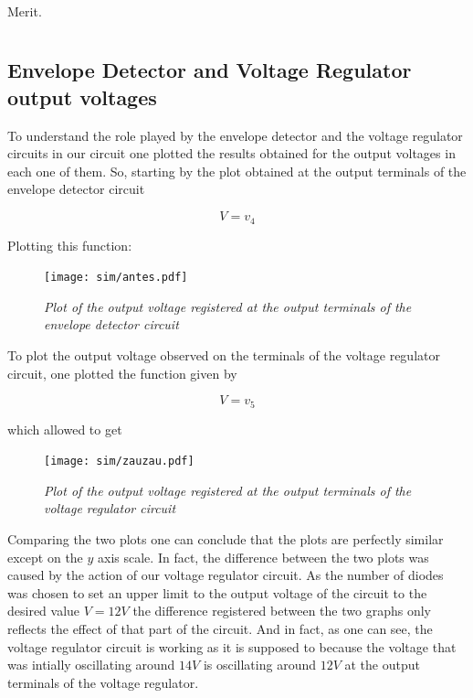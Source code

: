 \begin{table}[H]
    \centering
    \begin{tabular}{|c|c|}
          \hline
          
          \hline
    \end{tabular}
    \caption{Merit.}
    \label{tab:fresnel}
\end{table}

\subsection{Envelope Detector and Voltage Regulator output voltages}
To understand the role played by the envelope detector and the voltage regulator circuits in our circuit one plotted the results obtained for the output voltages in each one of them. So, starting by the plot obtained at the output terminals of the envelope detector circuit

\begin{equation}
    V = v_4
\end{equation}

Plotting this function:

\vspace{-140px}
\begin{figure}[H]
    \centering
    \texttt{[image: sim/antes.pdf]}
    \vspace*{-10mm}
        \caption{\textit{Plot of the output voltage registered at the output terminals of the envelope detector circuit}}
    \label{fig:before}
\end{figure}

To plot the output voltage observed on the terminals of the voltage regulator circuit, one plotted the function given by

\begin{equation}
    V = v_5
\end{equation}

which allowed to get

\vspace{-140px}
\begin{figure}[H]
    \centering
    \texttt{[image: sim/zauzau.pdf]}
    \vspace*{-10mm}
        \caption{\textit{Plot of the output voltage registered at the output terminals of the voltage regulator circuit}}
    \label{fig:zauzau}
\end{figure}

Comparing the two plots one can conclude that the plots are perfectly similar except on the $y$ axis scale. In fact, the difference between the two plots was caused by the action of our voltage regulator circuit. As the number of diodes was chosen to set an upper limit to the output voltage of the circuit to the desired value $V = 12V$ the difference registered between the two graphs only reflects the effect of that part of the circuit. And in fact, as one can see, the voltage regulator circuit is working as it is supposed to because the voltage that was intially oscillating around $14V$ is oscillating around $12V$ at the output terminals of the voltage regulator.

